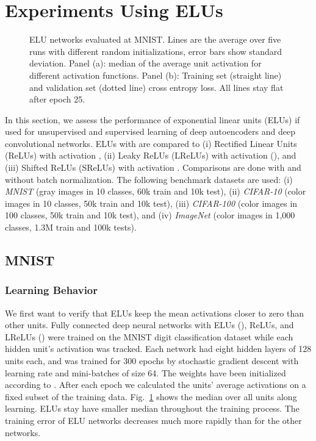 \documentclass{article}
\begin{document}
\section{Experiments Using ELUs}
\label{sec:exp}
\begin{figure}[!ht]
\begin{center}
\end{center}
\caption{ELU networks evaluated at MNIST. Lines are
the average over five runs with different random initializations, error
bars show standard deviation.
Panel (a): median of the average unit activation for different
activation functions.
Panel (b): Training set (straight line) and validation set (dotted line)
 cross entropy loss. All lines stay flat after epoch 25.
\label{fig:mnistplots}}
\end{figure}

In this section, we assess the performance of exponential linear units (ELUs)
if used for unsupervised and supervised learning of deep autoencoders and
deep convolutional networks. ELUs with   are compared to
(i) Rectified Linear Units (ReLUs) with activation ,
(ii) Leaky ReLUs (LReLUs) with activation  (), and
(iii) Shifted ReLUs (SReLUs) with activation .
Comparisons are done with and without batch normalization.
The following benchmark datasets are used:
(i) {\em MNIST} (gray images in 10 classes, 60k train and 10k test),
(ii) {\em CIFAR-10} (color images in 10 classes, 50k train and 10k test),
(iii) {\em CIFAR-100} (color images in 100 classes, 50k train and 10k test), and
(iv) {\em ImageNet} (color images in 1,000 classes, 1.3M train and 100k tests).


\subsection{MNIST}

\subsubsection{Learning Behavior}
We first want to verify that ELUs keep the mean activations closer to
zero than other units. Fully connected deep neural networks
with ELUs (), ReLUs, and LReLUs () were
trained on the MNIST digit classification
dataset while each hidden unit's activation was tracked.
Each network had eight hidden layers of 128 units each, and was trained
for 300 epochs by
stochastic gradient descent with
learning rate  and mini-batches of size 64.
The weights have been initialized according to \citep{He:15}.
After each epoch we calculated the units' average activations on a fixed
subset of the training data.
Fig.~\ref{fig:mnistplots} shows the median over all units along learning.
ELUs stay have smaller median throughout the training process.
The training error of ELU networks decreases much more rapidly than for the other
networks.
\end{document}

